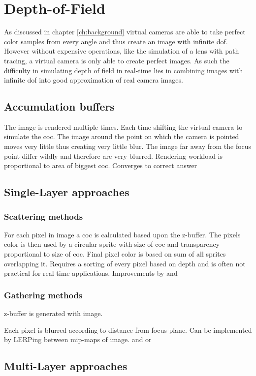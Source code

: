 \chapter{Depth-of-Field}
As discussed in chapter \ref{ch:background} virtual cameras are able to take perfect color samples from every angle and thus create an image with infinite \gls{dof}.
However without expensive operations, like the simulation of a lens with path tracing, a virtual camera is only able to create perfect images.
As such the difficulty in simulating depth of field in real-time lies in combining images with infinite \gls{dof} into good approximation of real camera images.
\section{Accumulation buffers}
The image is rendered multiple times.
Each time shifting the virtual camera to simulate the \gls{coc}.
The image around the point on which the camera is pointed moves very little thus creating very little blur.
The image far away from the focus point differ wildly and therefore are very blurred.
Rendering workload is proportional to area of biggest \gls{coc}. 
Converges to correct answer
\cite{Haeberli.1990}

\section{Single-Layer approaches}

\subsection{Scattering methods}
For each pixel in image a \gls{coc} is calculated based upon the z-buffer.
The pixels color is then used by a circular sprite with size of \gls{coc} and transparency proportional to size of \gls{coc}.
Final pixel color is based on sum of all sprites overlapping it.
Requires a sorting of every pixel based on depth and is often not practical for real-time applications.
\cite{Potmesil.1981}
Improvements by \cite{Rokita.1993} and \cite{Dudkiewicz.1995}
\subsection{Gathering methods}
z-buffer is generated with image.

Each pixel is blurred according to distance from focus plane.
Can be implemented by LERPing between mip-maps of image.
\cite{Gilham.2007} and \cite{Hammon.2008}
or \cite{Lee.2009}

\section{Multi-Layer approaches}

\cite{Kraus.2007}
\cite{Zhou.2007}

